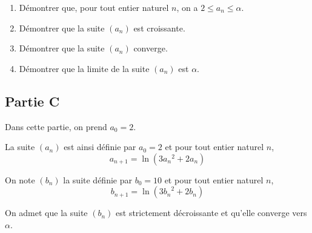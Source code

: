 \documentclass[10pt]{article}
\begin{document}
\begin{enumerate}
	\item Démontrer que, pour tout entier naturel $n$, on a $2 \leqslant a_{n} \leqslant \alpha$.

	\item Démontrer que la suite $(a_{n})$ est croissante.

	\item Démontrer que la suite $(a_{n})$ converge.

	\item Démontrer que la limite de la suite $(a_{n})$ est $\alpha$.
\end{enumerate}

\subsection*{Partie C}
Dans cette partie, on prend $a_{0}=2$.

La suite $(a_{n})$ est ainsi définie par $a_{0}=2$ et pour tout entier naturel $n$,
\[a_{n+1}=\ln \left(3 {a_{n}}^{2}+2 a_{n}\right)\]

On note $(b_{n})$ la suite définie par $b_{0}=10$ et pour tout entier naturel $n$,
\[b_{n+1}=\ln \left(3 {b_{n}}^{2}+2 b_{n}\right)\]

On admet que la suite $\left(b_{n}\right)$ est strictement décroissante et qu'elle converge vers $\alpha$.
\end{document}
